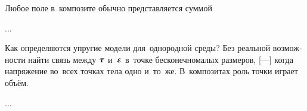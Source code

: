 

\begin{otherlanguage}{russian}

Любое поле в~композите обычно представляется суммой

...



\end{otherlanguage}



\begin{otherlanguage}{russian}

Как определяются упругие модели для~однородной среды?
Без реальной возможности найти связь между ${\hspace{-0.1ex}\cauchystress\hspace{.1ex}}$ и~$\mathboldepsilon$ в~точке бесконечно\-малых размеров,     [---] когда напряжение во~всех точках тела одно и~то~же.
В~композитах роль точки играет  объём.

...

\end{otherlanguage}



